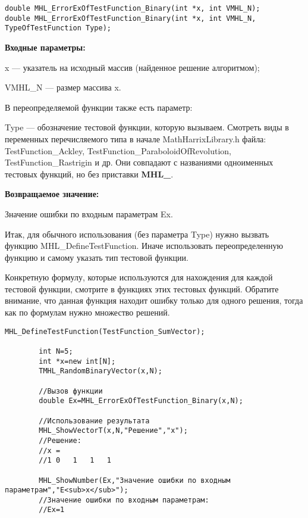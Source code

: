 \documentclass[a4paper,12pt]{article}
\begin{document}
\begin{lstlisting}[label=code_syntax_MHL_ErrorExOfTestFunction_Binary,caption=Синтаксис]
double MHL_ErrorExOfTestFunction_Binary(int *x, int VMHL_N);
double MHL_ErrorExOfTestFunction_Binary(int *x, int VMHL_N, TypeOfTestFunction Type);
\end{lstlisting}

\textbf{Входные параметры:}

x --- указатель на исходный массив (найденное решение алгоритмом);

VMHL\_N --- размер массива x.

В переопределяемой функции также есть параметр:
  
Type --- обозначение тестовой функции, которую вызываем.
Смотреть виды в переменных перечисляемого типа в начале MathHarrixLibrary.h файла: TestFunction\_Ackley, TestFunction\_ParaboloidOfRevolution, TestFunction\_Rastrigin и др. Они совпадают с названиями одноименных тестовых функций, но без приставки \textbf{MHL\_}.

\textbf{Возвращаемое значение:}
 
Значение ошибки по входным параметрам Ex.

Итак, для обычного использования (без параметра Type) нужно вызвать функцию MHL\_DefineTestFunction. Иначе использовать переопределенную функцию и самому указать тип тестовой функции.

Конкретную формулу, которые используются для нахождения для каждой тестовой функции, смотрите в функциях этих тестовых функций. Обратите внимание, что данная функция находит ошибку только для одного решения, тогда как по формулам нужно множество решений.


\begin{lstlisting}[label=code_use_MHL_ErrorExOfTestFunction_Binary,caption=Пример использования]
        MHL_DefineTestFunction(TestFunction_SumVector);

        int N=5;
        int *x=new int[N];
        TMHL_RandomBinaryVector(x,N);

        //Вызов функции
        double Ex=MHL_ErrorExOfTestFunction_Binary(x,N);

        //Использование результата
        MHL_ShowVectorT(x,N,"Решение","x");
        //Решение:
        //x =	
        //1	0	1	1	1

        MHL_ShowNumber(Ex,"Значение ошибки по входным параметрам","E<sub>x</sub>");
        //Значение ошибки по входным параметрам:
        //Ex=1
\end{lstlisting}
\end{document}
